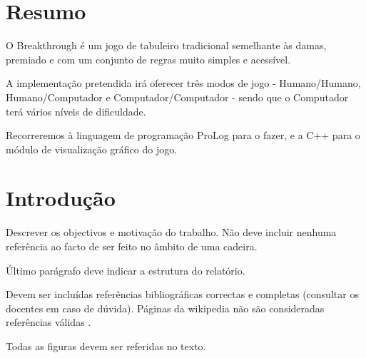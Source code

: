 \documentclass[15pt,a4paper]{article}
\begin{document}
\newpage

\section*{Resumo}


O Breakthrough é um jogo de tabuleiro tradicional semelhante às damas, premiado e com um conjunto de regras muito simples e acessível.

A implementação pretendida irá oferecer três modos de jogo - Humano/Humano, Humano/Computador e Computador/Computador - sendo que o Computador terá vários níveis
de dificuldade.

Recorreremos à linguagem de programação ProLog para o fazer, e a C++ para o módulo de visualização gráfico do jogo.




\section{Introdução}
Descrever os objectivos e motivação do trabalho. Não deve incluir nenhuma referência ao facto de ser feito no âmbito de uma cadeira.

Último parágrafo deve indicar a estrutura do relatório.

Devem ser incluídas referências bibliográficas correctas e completas (consultar os docentes em caso de dúvida). Páginas da wikipedia não são consideradas referências válidas \cite{CodigoSite, CodigoLivro}.

Todas as figuras devem ser referidas no texto. %


\end{document}
